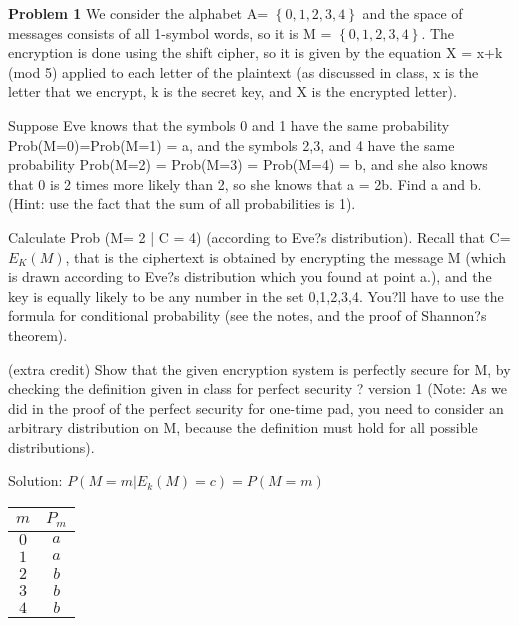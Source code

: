 \documentclass[12pt,letterpaper,final]{report}
\begin{document}

\vline


\noindent\textbf{Problem 1}
We consider the alphabet A= $\left\{0,1,2,3,4\right\}$ and the space of messages consists of all 1-symbol words, so it is M = $\left\{0,1,2,3,4\right\}$. The encryption is done using the shift cipher, so it is given by the equation X = x+k (mod 5) applied to each letter of the plaintext (as discussed in class, x is the letter that we encrypt, k is the secret key, and X is the encrypted letter).  

\bigskip
{}
\begin{alphalist}
	\item Suppose Eve knows that the symbols 0 and 1 have the same probability Prob(M=0)=Prob(M=1) = a, and the symbols 2,3, and 4 have the same probability Prob(M=2) = Prob(M=3) = Prob(M=4) = b, and she also knows that 0 is 2 times more likely than 2, so she knows that a = 2b.  Find a and b. (Hint: use the fact that the sum of all probabilities is 1).
	\item Calculate Prob (M= 2 | C = 4)  (according to Eve?s distribution).  Recall that C= $E_{K}(M)$, that is the ciphertext is obtained by encrypting the message M (which is drawn according to Eve?s distribution which you found at point a.), and the key is equally likely to be any number in the set {0,1,2,3,4}. You?ll have to use the formula for conditional probability (see the notes, and the proof of Shannon?s theorem).
	\item (extra credit) Show that the given encryption system is perfectly secure for M, by checking the definition given in class for perfect security ? version 1 (Note: As we did in the proof of the perfect security for  one-time pad, you need to consider an arbitrary distribution on M, because the definition must hold for all possible distributions).
\end{alphalist}
\bigskip
	Solution: $P (M = m | E_{k}(M) = c) = P(M=m)$
\indent\begin{tabular}{|c|c|}
\hline
$m$ & $P_{m}$ \\
\hline
$0$ & $ a$ \\
$1$ & $ a$ \\
$2$ & $ b$ \\
$3$ & $ b$ \\
$4$ & $ b$ \\
\hline
\end{tabular}
\end{document}
